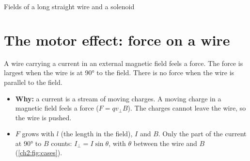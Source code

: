 \begin{formulacard}[unbreakable]{Fields of a long straight wire and a solenoid}
  \begin{symbols}
  \end{symbols}
\end{formulacard}

\section{The motor effect: force on a wire}\label{ch2:sec:motor}

\begin{bigidea}
A wire carrying a current in an external magnetic field feels a force. The force is largest when
the wire is at \ang{90} to the field. There is no force when the wire is parallel to the field.
\end{bigidea}

\begin{keywords}
\end{keywords}

\begin{itemize}
  \item \textbf{Why:} a current is a stream of moving charges. A moving charge in a magnetic field
        feels a force ($F = qv_\perp B$). The charges cannot leave the wire, so the wire is pushed.
  \item $F$ grows with $l$ (the length in the field), $I$ and $B$. Only the part of the current at
        \ang{90} to $B$ counts: $I_\perp = I\sin\theta$, with $\theta$ between the wire and $B$
        (\cref{ch2:fig:cases}).
\end{itemize}

